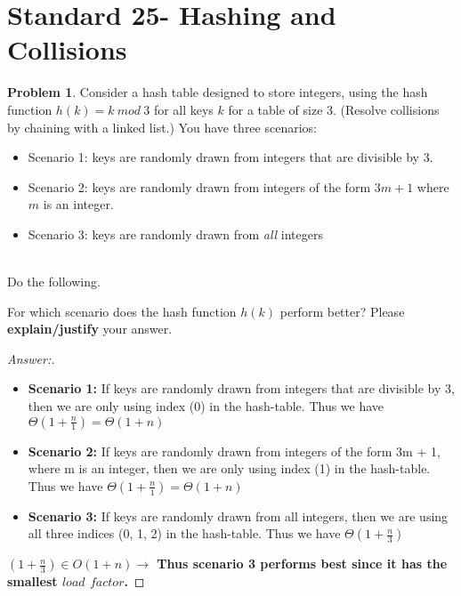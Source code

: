 \documentclass[11pt]{article}
\theoremstyle{definition}
\theoremstyle{definition}
\newtheorem{required}{Problem}
\theoremstyle{definition}
\begin{document}
\section{Standard 25- Hashing and Collisions}
\begin{required}
Consider a hash table designed to store integers, using the hash function $h(k)=k~mod~3$ for all keys $k$ for a table of size 3. (Resolve collisions by chaining with a linked list.) You have three scenarios: 
\begin{itemize}
\item Scenario 1: keys are randomly drawn from integers that are divisible by 3.

\item Scenario 2: keys are randomly drawn from integers of the form $3m+1$ where $m$ is an integer.

\item Scenario 3: keys are randomly drawn from \emph{all} integers
\end{itemize}


\noindent \\ Do the following.
\begin{enumerate}[label=(\alph*)]
\item For which scenario does the hash function $h(k)$ perform better? Please  {\bf explain/justify} your answer.


\begin{proof}[Answer:] \
\begin{itemize}
\item \textbf{Scenario 1:} If keys are randomly drawn from integers that are divisible by 3, then we are only using index (0) in the hash-table. Thus we have $\Theta(1 + \frac{n}{1}) = \Theta(1 + n)$ \\
\item \textbf{Scenario 2:} If keys are randomly drawn from integers of the form 3m + 1, where m is an integer, then we are only using index (1) in the hash-table. Thus we have $\Theta(1 + \frac{n}{1}) = \Theta(1 + n)$ \\
\item \textbf{Scenario 3:} If keys are randomly drawn from all integers, then we are using all three indices (0, 1, 2) in the hash-table. Thus we have $\Theta(1 + \frac{n}{3})$ \\
\end{itemize}
\item \textbf{$(1 + \frac{n}{3}) \in O(1 + n) \to$ Thus scenario 3 performs best since it has the smallest $load$ $factor$.}
\end{proof}


\end{enumerate}
\end{required}
\end{document}
